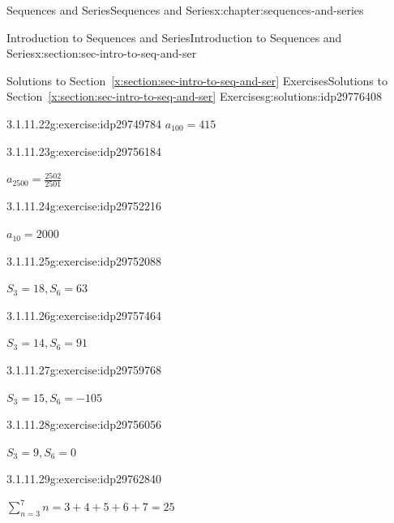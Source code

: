\documentclass[twoside,10pt,]{book}
\newcommand{\xreffont}{\relax}
\numberwithin{equation}{section}
\begin{document}
\begin{chapterptx}{Sequences and Series}{}{Sequences and Series}{}{}{x:chapter:sequences-and-series}
\begin{sectionptx}{Introduction to Sequences and Series}{}{Introduction to Sequences and Series}{}{}{x:section:sec-intro-to-seq-and-ser}
\begin{solutions-subsection}{Solutions to Section~{\xreffont\ref*{x:section:sec-intro-to-seq-and-ser}} Exercises}{}{Solutions to Section~{\xreffont\ref*{x:section:sec-intro-to-seq-and-ser}} Exercises}{}{}{g:solutions:idp29776408}
\begin{exercisegroup}
\begin{divisionsolutioneg}{3.1.11.22}{}{g:exercise:idp29749784}
\noindent\hypertarget{g:solution:idp29756312-main}{}\(a_{100} = 415\)\end{divisionsolutioneg}%
\begin{divisionsolutioneg}{3.1.11.23}{}{g:exercise:idp29756184}%
\par\smallskip%
\noindent\hypertarget{g:solution:idp29753368-main}{}\(a_{2500} = \frac{2502}{2501}\)\end{divisionsolutioneg}%
\begin{divisionsolutioneg}{3.1.11.24}{}{g:exercise:idp29752216}%
\par\smallskip%
\noindent\hypertarget{g:solution:idp29757720-main}{}\(a_{10} = 2000\)\end{divisionsolutioneg}%
\end{exercisegroup}
\par\medskip\noindent
\begin{exercisegroup}
\begin{divisionsolutioneg}{3.1.11.25}{}{g:exercise:idp29752088}%
\par\smallskip%
\noindent\hypertarget{g:solution:idp29755416-main}{}\(S_3 = 18, S_6 = 63\)\end{divisionsolutioneg}%
\begin{divisionsolutioneg}{3.1.11.26}{}{g:exercise:idp29757464}%
\par\smallskip%
\noindent\hypertarget{g:solution:idp29757592-main}{}\(S_3 = 14, S_6 = 91\)\end{divisionsolutioneg}%
\begin{divisionsolutioneg}{3.1.11.27}{}{g:exercise:idp29759768}%
\par\smallskip%
\noindent\hypertarget{g:solution:idp29755032-main}{}\(S_3 = 15, S_6 = -105\)\end{divisionsolutioneg}%
\begin{divisionsolutioneg}{3.1.11.28}{}{g:exercise:idp29756056}%
\par\smallskip%
\noindent\hypertarget{g:solution:idp29764760-main}{}\(S_3 = 9, S_6 = 0\)\end{divisionsolutioneg}%
\end{exercisegroup}
\par\medskip\noindent
\begin{exercisegroup}
\begin{divisionsolutioneg}{3.1.11.29}{}{g:exercise:idp29762840}%
\par\smallskip%
\noindent\hypertarget{g:solution:idp29762200-main}{}\(\sum\limits_{n = 3}^7 n  = 3 + 4 + 5 + 6 + 7 = 25\)\end{divisionsolutioneg}%

\end{exercisegroup}
\end{solutions-subsection}
\end{sectionptx}
\end{chapterptx}
\end{document}
